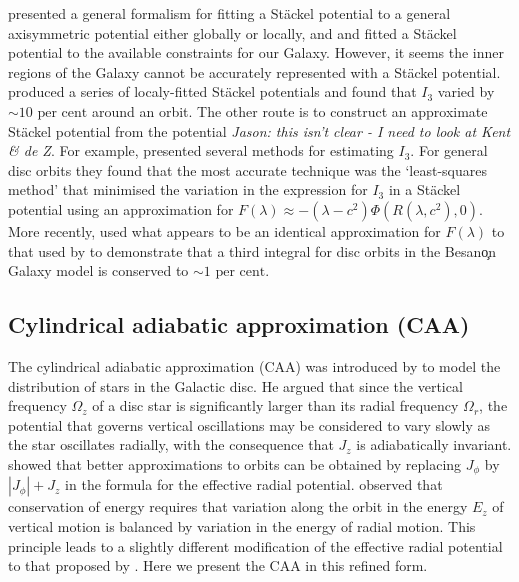 \documentclass[useAMS,usenatbib,fleqn,a4paper]{mn2e}
\def\percent{\text{ per cent}}
\def\percent{\text{ per cent}}
\begin{document}
\cite{DejonghedeZeeuw1988} presented a general formalism for fitting a
St\"ackel potential to a general axisymmetric potential either globally or
locally, and \cite{BatsleerDejonghe} and \cite{Famaey2003} fitted a St\"ackel
potential to the available constraints for our Galaxy.  However, it seems the
inner regions of the Galaxy cannot be accurately represented with a St\"ackel
potential.  \cite{deBruyne2000} produced a series of localy-fitted St\"ackel
potentials and found that $I_3$ varied by $\sim10\percent$ around an orbit.
The other route is to construct an approximate St\"ackel potential from the
potential {\sl Jason: this isn't clear - I need to look at Kent \& de Z}. For
example, \cite{KentdeZeeuw1991} presented several methods for estimating
$I_3$. For general disc orbits they found that the most accurate technique
was the `least-squares method' that minimised the variation in the expression
for $I_3$ in a St\"ackel potential using an approximation for
$F(\lambda)\approx-(\lambda-c^2)\Phi(R(\lambda,c^2),0)$.  More recently,
\cite{Bienayme2015} used what appears to be an identical approximation for
$F(\lambda)$ to that used by \cite{KentdeZeeuw1991} to demonstrate that a
third integral for disc orbits in the Besan\c on Galaxy model is conserved to
$\sim 1\percent$.

\subsection{Cylindrical adiabatic approximation (CAA)}\label{Method::PAA}

The cylindrical adiabatic approximation (CAA) was introduced by
\cite{Binney2010} to model the distribution of stars in the Galactic disc. He
argued that since the vertical frequency $\Omega_z$ of a disc star is
significantly larger than its radial frequency $\Omega_r$, the potential that
governs vertical oscillations may be considered to vary slowly as the star
oscillates radially, with the consequence that $J_z$ is adiabatically
invariant.  \citet{BinneyMcMillan2011} showed that better approximations to
orbits can be obtained by replacing $J_\phi$ by $|J_\phi|+J_z$ in the formula
for the effective radial potential.  \citet{Schonrich2012} observed that
conservation of energy requires that variation along the orbit in the energy
$E_z$ of vertical motion is balanced by variation in the energy of radial
motion. This principle leads to a slightly different modification of the
effective radial potential to that proposed by \citet{BinneyMcMillan2011}.
Here we present the CAA in this refined form.
\end{document}
